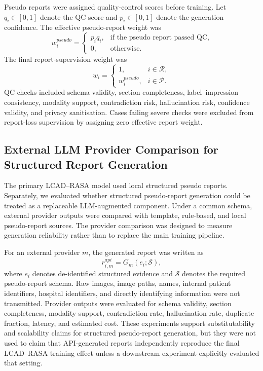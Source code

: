 Pseudo reports were assigned quality-control scores before training. Let \(q_i\in[0,1]\) denote the QC score and \(p_i\in[0,1]\) denote the generation confidence. The effective pseudo-report weight was
\begin{equation}
w_i^{pseudo}=
\begin{cases}
p_iq_i, & \text{if the pseudo report passed QC},\\
0, & \text{otherwise}.
\end{cases}
\end{equation}
The final report-supervision weight was
\begin{equation}
w_i=
\begin{cases}
1, & i\in\mathcal{R},\\
w_i^{pseudo}, & i\in\mathcal{P}.
\end{cases}
\end{equation}
QC checks included schema validity, section completeness, label--impression consistency, modality support, contradiction risk, hallucination risk, confidence validity, and privacy sanitisation. Cases failing severe checks were excluded from report-loss supervision by assigning zero effective report weight.

\subsection{External LLM Provider Comparison for Structured Report Generation}
\label{subsec:methods_api_provider}

The primary LCAD--RASA model used local structured pseudo reports. Separately, we evaluated whether structured pseudo-report generation could be treated as a replaceable LLM-augmented component. Under a common schema, external provider outputs were compared with template, rule-based, and local pseudo-report sources. The provider comparison was designed to measure generation reliability rather than to replace the main training pipeline.

For an external provider \(m\), the generated report was written as
\begin{equation}
r_{i,m}^{api}=G_m(e_i;\mathcal{S}),
\end{equation}
where \(e_i\) denotes de-identified structured evidence and \(\mathcal{S}\) denotes the required pseudo-report schema. Raw images, image paths, names, internal patient identifiers, hospital identifiers, and directly identifying information were not transmitted. Provider outputs were evaluated for schema validity, section completeness, modality support, contradiction rate, hallucination rate, duplicate fraction, latency, and estimated cost. These experiments support substitutability and scalability claims for structured pseudo-report generation, but they were not used to claim that API-generated reports independently reproduce the final LCAD--RASA training effect unless a downstream experiment explicitly evaluated that setting.

